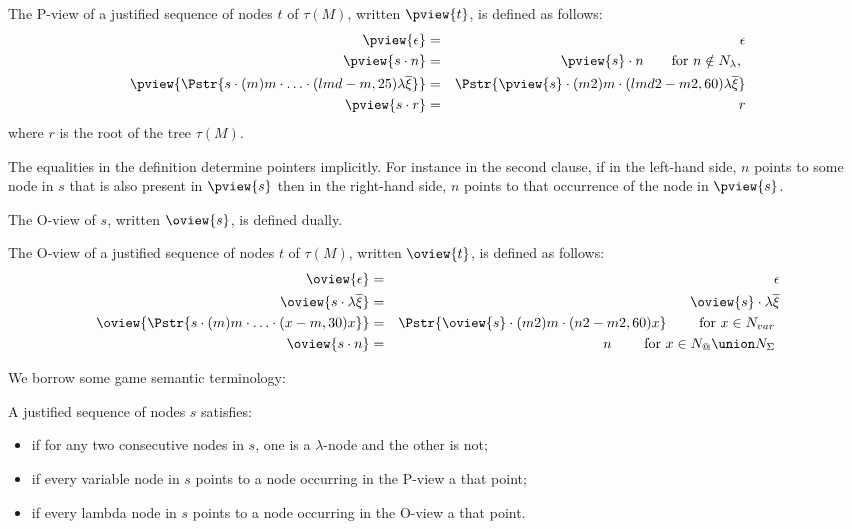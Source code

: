 \begin{definition}
The P-view of a justified sequence of nodes $t$ of $\tau(M)$, written $\pview{t}$, is defined as follows:
\begin{eqnarray*}
 \pview{\epsilon} &=&  \epsilon \\
 \pview{s \cdot n }  &=&  \pview{s} \cdot n \qquad \mbox{for $n \notin N_\lambda$, }\\
 \pview{\Pstr{ s \cdot (m){m} \cdot \ldots \cdot (lmd-m,25){\lambda \overline{\xi}}}} &=&
        \Pstr{ \pview{s} \cdot (m2){m} \cdot (lmd2-m2,60){\lambda \overline{\xi}} } \\
 \pview{s \cdot r }  &=&  r
\end{eqnarray*}
where $r$ is the root of the tree $\tau(M)$.

The equalities in the definition determine pointers implicitly. For
instance in the second clause, if in the left-hand side, $n$ points
to some node in $s$  that is also present in $\pview{s}$ then in the
right-hand side, $n$ points to that occurrence of the node in
$\pview{s}$.
\end{definition}

The O-view of $s$, written $\oview{s}$, is defined dually.
\begin{definition}
The O-view of a justified sequence of nodes $t$ of $\tau(M)$, written $\oview{t}$, is defined as follows:
\begin{eqnarray*}
 \oview{\epsilon} &=&  \epsilon \\
 \oview{s \cdot \lambda \overline{\xi} }  &=&  \oview{s} \cdot \lambda \overline{\xi} \\
 \oview{\Pstr{s \cdot (m){m} \cdot \ldots \cdot (x-m,30){x}}} &=&
    \Pstr{ \oview{s} \cdot (m2){m} \cdot (n2-m2,60){x} } \qquad \mbox{ for $x \in N_{var}$ }\\
 \oview{s \cdot n }  &=&  n \qquad \mbox{ for $x \in N_@ \union N_\Sigma$ }
\end{eqnarray*}
\end{definition}

We borrow some game semantic terminology:
\begin{definition} A justified sequence of nodes $s$ satisfies:
\begin{itemize}[-]
\item {} if for any two consecutive nodes in $s$, one is a $\lambda$-node
and the other is not;
\item {} if every variable node in $s$ points to a node occurring in the P-view a that point;
\item  {} if every lambda node in $s$ points to a node occurring in the O-view a that point.
\end{itemize}
\end{definition}

